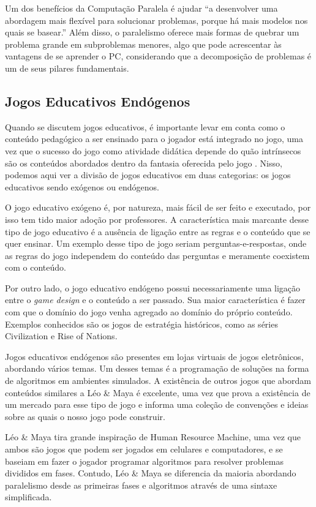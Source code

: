 \documentclass[conference]{IEEEtran}
\begin{document}
Um dos benefícios da Computação Paralela é ajudar ``a desenvolver uma abordagem mais flexível para solucionar problemas, porque há mais modelos nos quais se basear.''\cite{b5} Além disso, o paralelismo oferece mais formas de quebrar um problema grande em subproblemas menores, algo que pode acrescentar às vantagens de se aprender o PC, considerando que a decomposição de problemas é um de seus pilares fundamentais\cite{b5}.

\subsection{Jogos Educativos Endógenos}

Quando se discutem jogos educativos, é importante levar em conta como o conteúdo pedagógico a ser ensinado para o jogador está integrado no jogo, uma vez que o sucesso do jogo como atividade didática depende do quão intrínsecos são os conteúdos abordados dentro da fantasia oferecida pelo jogo \cite{b13}. Nisso, podemos aqui ver a divisão de jogos educativos em duas categorias: os jogos educativos sendo exógenos ou endógenos\cite{b14}.

O jogo educativo exógeno é, por natureza, mais fácil de ser feito e executado, por isso tem tido maior adoção por professores.\cite{b14} A característica mais marcante desse tipo de jogo educativo é a ausência de ligação entre as regras e o conteúdo que se quer ensinar.  Um exemplo desse tipo de jogo seriam perguntas-e-respostas, onde as regras do jogo independem do conteúdo das perguntas e meramente coexistem com o conteúdo.

Por outro lado, o jogo educativo endógeno possui necessariamente uma ligação entre o \textit{game design} e o conteúdo a ser passado. Sua maior característica é fazer com que o domínio do jogo venha agregado ao domínio do próprio conteúdo. Exemplos conhecidos são os jogos de estratégia históricos, como as séries Civilization e Rise of Nations\cite{b14}.

Jogos educativos endógenos são presentes em lojas virtuais de jogos eletrônicos, abordando vários temas. Um desses temas é a programação de soluções na forma de algoritmos em ambientes simulados\cite{b15}\cite{b16}\cite{b17}. A existência de outros jogos que abordam conteúdos similares a Léo \& Maya é excelente, uma vez que prova a existência de um mercado para esse tipo de jogo e informa uma coleção de convenções e ideias sobre as quais o nosso jogo pode construir.

Léo \& Maya tira grande inspiração de Human Resource Machine\cite{b18}, uma vez que ambos são jogos que podem ser jogados em celulares e computadores, e se baseiam em fazer o jogador programar algoritmos para resolver problemas  divididos em fases. Contudo, Léo \& Maya se diferencia da maioria abordando paralelismo desde as primeiras fases e algoritmos através de uma sintaxe simplificada.
\end{document}
